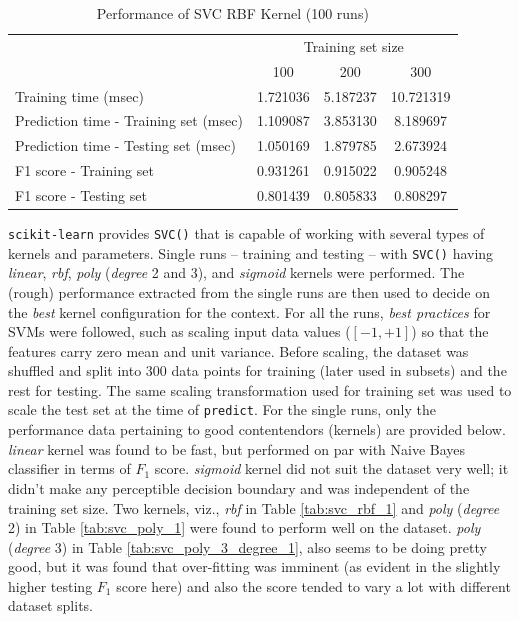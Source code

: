 \documentclass{article}
\begin{document}
	\begin{table}[!ht]
		\centering
		\begin{tabular}{l|ccc}
			\toprule
			{} & \multicolumn{3}{c}{Training set size} \\
			{} &       100 &       200 &        300 \\
			\midrule
			Training time (msec)                  &  1.721036 &  5.187237 &  10.721319 \\
			Prediction time - Training set (msec) &  1.109087 &  3.853130 &   8.189697 \\
			Prediction time - Testing set (msec)  &  1.050169 &  1.879785 &   2.673924 \\
			F1 score - Training set               &  0.931261 &  0.915022 &   0.905248 \\
			F1 score - Testing set                &  0.801439 &  0.805833 &   0.808297 \\
			\bottomrule
		\end{tabular}
		\caption{Performance of SVC RBF Kernel (100 runs)}
		\label{tab:svc_rbf_100}
	\end{table}
	
	\texttt{scikit-learn} provides \texttt{SVC()} that is capable of working with several types of kernels and parameters. Single runs -- training and testing -- with \texttt{SVC()} having \emph{linear}, \emph{rbf}, \emph{poly} (\emph{degree} 2 and 3), and \emph{sigmoid} kernels were performed. The (rough) performance extracted from the single runs are then used to decide on the \emph{best} kernel configuration for the context. For all the runs, \emph{best practices} for SVMs \cite{hsu2003} were followed, such as scaling input data values ($[-1,+1]$) so that the features carry zero mean and unit variance. Before scaling, the dataset was shuffled and split into 300 data points for training (later used in subsets) and the rest for testing. The same scaling transformation used for training set was used to scale the test set at the time of \texttt{predict}. For the single runs, only the performance data pertaining to good contentendors (kernels) are provided below. \emph{linear} kernel was found to be fast, but performed on par with Naive Bayes classifier in terms of $F_1$ score. \emph{sigmoid} kernel did not suit the dataset very well; it didn't make any perceptible decision boundary and was independent of the training set size. Two kernels, viz., \emph{rbf} in Table \ref{tab:svc_rbf_1} and \emph{poly} (\emph{degree} 2) in Table \ref{tab:svc_poly_1} were found to perform well on the dataset. \emph{poly} (\emph{degree} 3) in Table \ref{tab:svc_poly_3_degree_1}, also seems to be doing pretty good, but it was found that over-fitting was imminent (as evident in the slightly higher testing $F_1$ score here) and also the score tended to vary a lot with different dataset splits. 
	
\end{document}
